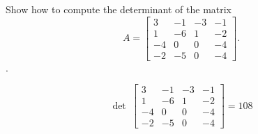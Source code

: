 
\begin{exerciseStatement}


Show how to compute the determinant of the matrix \[A= \left[\begin{array}{cccc}
3 & -1 & -3 & -1 \\
1 & -6 & 1 & -2 \\
-4 & 0 & 0 & -4 \\
-2 & -5 & 0 & -4
\end{array}\right] .\].


\end{exerciseStatement}
    
\begin{exerciseAnswer} 
\[\operatorname{det}\  \left[\begin{array}{cccc}
3 & -1 & -3 & -1 \\
1 & -6 & 1 & -2 \\
-4 & 0 & 0 & -4 \\
-2 & -5 & 0 & -4
\end{array}\right] = 108 \]
\end{exerciseAnswer}
    
